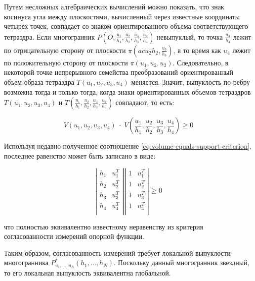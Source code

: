 \documentclass[a4paper, 12pt, titlepage]{article}
\theoremstyle{definition}
\theoremstyle{plain}
\theoremstyle{plain}
\begin{document}
Путем несложных алгебраических вычислений можно показать, что знак косинуса
угла между плоскостями, вычисленный через известные координаты четырех точек,
совпадает со знаком ориентированного объема соответствующего тетраэдра. Если
многогранник $P\left(O, \frac{u_{1}}{h_{1}}, \frac{u_{2}}{h_{2}},
\frac{u_{3}}{h_{3}}, \frac{u_{4}}{h_{4}}\right)$ невыпуклый, то точка
$\frac{u_{4}}{h_{4}}$ лежит по отрицательную сторону от плоскости
$\pi(ac{u_{2}}{h_{2}}, \frac{u_{3}}{h_{3}})$, в то время как $u_{4}$ лежит по
положительную сторону от плоскости $\pi(u_{1}, u_{2}, u_{3})$. Следовательно,
в некоторой точке непрерывного семейства преобразований ориентированный объем
образа тетраэдра $T(u_{1}, u_{2}, u_{3}, u_{4})$ меняется. Значит, выпуклость
по ребру возможна тогда и только тогда, когда знаки ориентированных объемов
тетраэдров $T(u_{1}, u_{2}, u_{3}, u_{4})$ и
$T\left(\frac{u_{1}}{h_{1}}, \frac{u_{2}}{h_{2}}, \frac{u_{3}}{h_{3}},
\frac{u_{4}}{h_{4}}\right)$ совпадают, то есть:

\begin{equation}
V(u_{1}, u_{2}, u_{3}, u_{4}) \; \cdot \;
V\left(\frac{u_{1}}{h_{1}}, \frac{u_{2}}{h_{2}}, \frac{u_{3}}{h_{3}},
\frac{u_{4}}{h_{4}}\right) \geq 0
\end{equation}

Используя недавно полученное соотношение
\ref{eq:volume-equals-support-criterion}, последнее равенство может быть
записано в виде:

\begin{equation}
\left|\begin{array}{cc}
  h_{1} & u_{1}^{T} \\
  h_{2} & u_{2}^{T} \\
  h_{3} & u_{3}^{T} \\
  h_{4} & u_{4}^{T} \\
\end{array}\right|
  \left|\begin{array}{cc}
  1 & u_{1}^{T} \\
  1 & u_{2}^{T} \\
  1 & u_{3}^{T} \\
  1 & u_{4}^{T} \\
\end{array}\right|
\geq 0
\end{equation}

что полностью эквивалентно известному неравенству из критерия согласованности
измерений опорной функции.

Таким образом, согласованность измерений требует локальной выпуклости
многогранника $P^{*}_{u_{1}, \ldots, u_{N}}(h_{1}, \ldots, h_{N})$. Поскольку
данный многогранник звездный, то его локальная выпуклость эквивалентна
глобальной.
\end{document}
